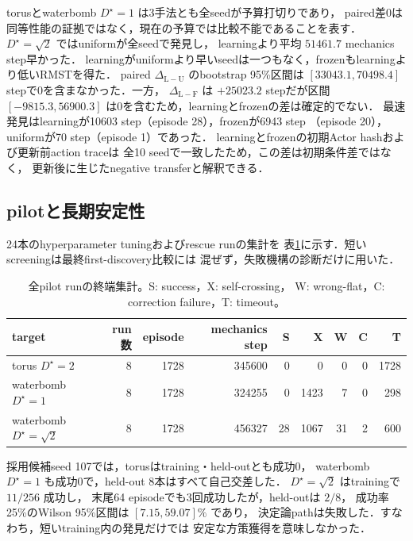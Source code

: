 \documentclass[a4paper,11pt]{ltjsarticle}
\begin{document}
torusとwaterbomb $D^\star=1$ は3手法とも全seedが予算打切りであり，
paired差0は同等性能の証拠ではなく，現在の予算では比較不能であることを表す．
$D^\star=\sqrt2$ ではuniformが全seedで発見し，
learningより平均 $51461.7$ mechanics step早かった．
learningがuniformより早いseedは一つもなく，frozenもlearningより低いRMSTを得た．
paired $\Delta_{\mathrm{L-U}}$ のbootstrap 95\%区間は
$[33043.1,70498.4]$ stepで0を含まなかった．一方，
$\Delta_{\mathrm{L-F}}$ は $+25023.2$ stepだが区間
$[-9815.3,56900.3]$ は0を含むため，learningとfrozenの差は確定的でない．
最速発見はlearningが10603 step（episode 28），frozenが6943 step
（episode 20），uniformが70 step（episode 1）であった．
learningとfrozenの初期Actor hashおよび更新前action traceは
全10 seedで一致したため，この差は初期条件差ではなく，
更新後に生じたnegative transferと解釈できる．

\subsection{pilotと長期安定性}

24本のhyperparameter tuningおよびrescue runの集計を
表\ref{tab:pilot-summary}に示す．短いscreeningは最終first-discovery比較には
混ぜず，失敗機構の診断だけに用いた．

\begin{table}[htbp]
\centering
\small
\caption{全pilot runの終端集計。S: success，X: self-crossing，
W: wrong-flat，C: correction failure，T: timeout。}
\label{tab:pilot-summary}
\begin{tabular}{lrrrrrrrr}
\toprule
target & run数 & episode & mechanics step & S & X & W & C & T \\
\midrule
torus $D^\star=2$ & 8 & 1728 & 345600 & 0 & 0 & 0 & 0 & 1728 \\
waterbomb $D^\star=1$ & 8 & 1728 & 324255 & 0 & 1423 & 7 & 0 & 298 \\
waterbomb $D^\star=\sqrt2$ & 8 & 1728 & 456327 & 28 & 1067 & 31 & 2 & 600 \\
\bottomrule
\end{tabular}
\end{table}

採用候補seed 107では，torusはtraining・held-outとも成功0，
waterbomb $D^\star=1$ も成功0で，held-out 8本はすべて自己交差した．
$D^\star=\sqrt2$ はtrainingで $11/256$ 成功し，
末尾64 episodeでも3回成功したが，held-outは $2/8$，
成功率25\%のWilson 95\%区間は $[7.15,59.07]\%$ であり，
決定論pathは失敗した．すなわち，短いtraining内の発見だけでは
安定な方策獲得を意味しなかった．
\end{document}
